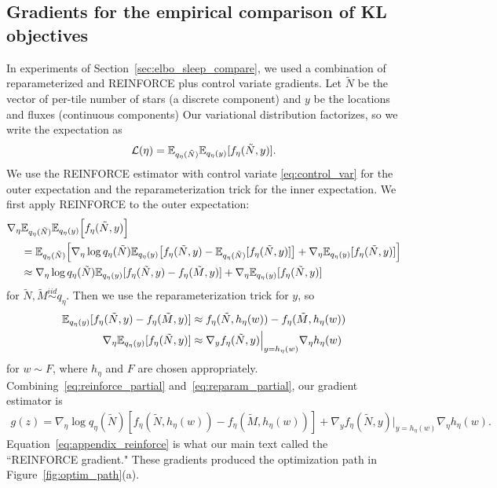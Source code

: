 \subsection{Gradients for the empirical comparison of KL objectives}
In experiments of Section~\ref{sec:elbo_sleep_compare}, 
we used a combination of reparameterized and REINFORCE plus control variate gradients.
Let $\tilde N$ be the vector of per-tile number of stars (a discrete component) and $y$ be the locations and fluxes (continuous components)
Our variational distribution factorizes, so we write the expectation as
\begin{align}
 \mathcal{L}(\eta) = \mathbb{E}_{q_\eta(\tilde N)}\mathbb{E}_{q_\eta(y)}[f_\eta(\tilde N, y)].
 \label{eq:elbo_factorized}
\end{align}
We use the REINFORCE estimator with control variate \eqref{eq:control_var} for the outer expectation and the reparameterization trick for the inner expectation. 
We first apply REINFORCE to the outer expectation:
\begin{align}
    \nabla_\eta  &
    \mathbb{E}_{q_\eta(\tilde N)}\mathbb{E}_{q_\eta(y)}\Big[f_\eta(\tilde N, y)\Big] \\
    &=  \mathbb{E}_{q_\eta(\tilde N)}\Big[ \nabla_\eta \log q_\eta(\tilde N) \mathbb{E}_{q_\eta(y)}\big[f_\eta(\tilde N, y) - 
    \mathbb{E}_{q_\eta(\tilde N)}[f_\eta(\tilde N, y)]\big] +
    \nabla_\eta \mathbb{E}_{q_\eta(y)}[f_\eta(\tilde N, y)] \Big]\\
    &\approx \nabla_\eta \log q_\eta(\tilde N) \mathbb{E}_{q_\eta(y)}[f_\eta(\tilde N, y) - f_\eta(\tilde M, y)] +
    \nabla_\eta \mathbb{E}_{q_\eta(y)}[f_\eta(\tilde N, y)]
    \label{eq:reinforce_partial}
\end{align}
 for $\tilde N,\tilde M \overset{iid}\sim q_\eta$.
Then we use the reparameterization trick for $y$, so
\begin{align}
    \mathbb{E}_{q_\eta(y)}[f_\eta(\tilde N, y) - f_\eta( \tilde M, y)] &\approx f_\eta(\tilde N, h_\eta(w)) - f_\eta(\tilde M, h_\eta(w))\\
    \nabla_\eta \mathbb{E}_{q_\eta(y)}[f_\eta(\tilde N, y)] &\approx  \nabla_y f_\eta(\tilde N, y)\Big|_{y = h_\eta(w)}
    \nabla_\eta h_\eta(w)
    \label{eq:reparam_partial}
\end{align}
for $w \sim F$, where $h_\eta$ and $F$ are chosen appropriately. Combining~\eqref{eq:reinforce_partial} and~\eqref{eq:reparam_partial}, our gradient estimator is
\begin{align}
    g(z) = \nabla_\eta \log q_\eta(\tilde N)
    [f_\eta(\tilde N, h_\eta(w)) - f_\eta(\tilde M, h_\eta(w))] +
    \nabla_y f_\eta(\tilde N, y)\Big|_{y = h_\eta(w)}
    \nabla_\eta h_\eta(w).
    \label{eq:appendix_reinforce}
\end{align}
Equation~\ref{eq:appendix_reinforce} is what our main text called the ``REINFORCE gradient."
These gradients produced the optimization path in Figure~\ref{fig:optim_path}(a).


